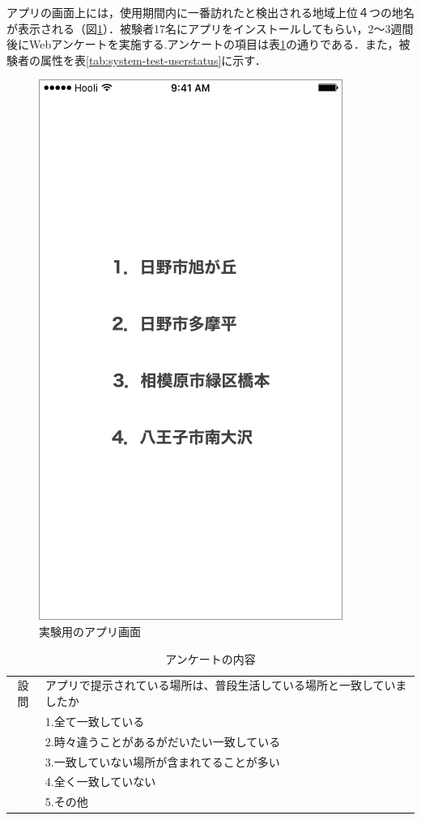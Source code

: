 \documentclass[a4paper]{jsarticle}
\begin{document}
アプリの画面上には，使用期間内に一番訪れたと検出される地域上位４つの地名が表示される（図\ref{fig:system-ui}）．被験者17名にアプリをインストールしてもらい，2〜3週間後にWebアンケートを実施する.アンケートの項目は表\ref{tab:system-test-content}の通りである．また，被験者の属性を表\ref{tab:system-test-userstatus}に示す．

\fifigure
\begin{figure}[H]
  \begin{center}
    \includegraphics[width=0.4\hsize]{./images/system.png}
    \caption{実験用のアプリ画面}
    \label{fig:system-ui}
  \end{center}
\end{figure}
\fi

\begin{table}[H]
  \begin{center}
    \caption{アンケートの内容}
    \renewcommand\arraystretch{1.2}
    \begin{tabular}{|c|l|}
      \hline
      設問 & \multicolumn{1}{p{12cm}|}{アプリで提示されている場所は、普段生活している場所と一致していましたか} \\
      & 1.全て一致している \\
      & 2.時々違うことがあるがだいたい一致している \\
      & 3.一致していない場所が含まれてることが多い \\
      & 4.全く一致していない \\
      & 5.その他 \\
      \hline
    \end{tabular}
    \label{tab:system-test-content}
  \end{center}
\end{table}
\end{document}
